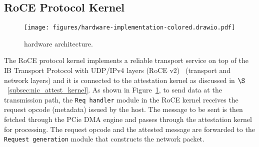

\subsection{RoCE Protocol Kernel}
\label{subsec:roce_protocol_kernel}

\begin{figure}[t!]
    \centering
     \texttt{[image: figures/hardware-implementation-colored.drawio.pdf]}
    \caption{\projecttitle{} hardware architecture.}
     \label{fig:hardware-design}
\end{figure}


 The RoCE protocol kernel implements a reliable transport service on top of the IB Transport Protocol with UDP/IPv4 layers (RoCE v2)~\cite{infiniband} (transport and network layers) and it is connected to the attestation kernel as discussed in $\S$~\ref{subsec:nic_attest_kernel}. As shown in Figure~\ref{fig:hardware-design}, to send data at the transmission path, the {\tt Req handler} module in the RoCE kernel receives the request opcode (metadata) issued by the host. The message to be sent is then fetched through the PCie DMA engine and passes through the attestation kernel for processing. The request opcode and the attested message are forwarded to the {\tt Request generation} module that constructs the network packet. %

